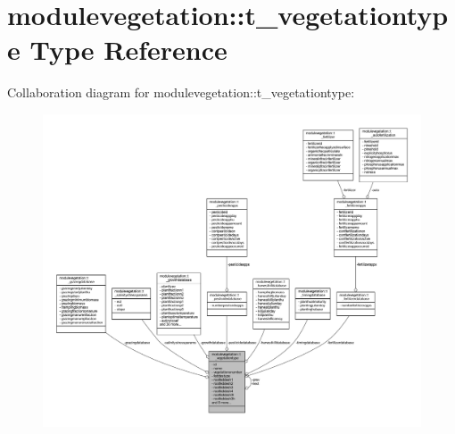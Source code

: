\hypertarget{structmodulevegetation_1_1t__vegetationtype}{}\section{modulevegetation\+:\+:t\+\_\+vegetationtype Type Reference}
\label{structmodulevegetation_1_1t__vegetationtype}


Collaboration diagram for modulevegetation\+:\+:t\+\_\+vegetationtype\+:\nopagebreak
\begin{figure}[H]
\begin{center}
\leavevmode
\includegraphics[width=350pt]{structmodulevegetation_1_1t__vegetationtype__coll__graph}
\end{center}
\end{figure}
